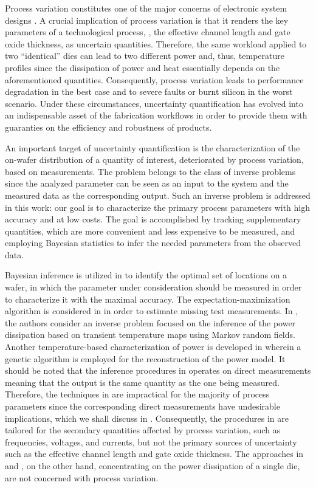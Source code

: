 Process variation constitutes one of the major concerns of electronic system designs \cite{chandrakasan2001, srivastava2010}. A crucial implication of process variation is that it renders the key parameters of a technological process, \eg, the effective channel length and gate oxide thickness, as uncertain quantities.
Therefore, the same workload applied to two ``identical'' dies can lead to two different power and, thus, temperature profiles since the dissipation of power and heat essentially depends on the aforementioned quantities.
Consequently, process variation leads to performance degradation in the best case and to severe faults or burnt silicon in the worst scenario.
Under these circumstances, uncertainty quantification has evolved into an indispensable asset of the fabrication workflows in order to provide them with guaranties on the efficiency and robustness of products.

An important target of uncertainty quantification is the characterization of the on-wafer distribution of a quantity of interest, deteriorated by process variation, based on measurements.
The problem belongs to the class of inverse problems since the analyzed parameter can be seen as an input to the system and the measured data as the corresponding output.
Such an inverse problem is addressed in this work: our goal is to characterize the primary process parameters with high accuracy and at low costs.
The goal is accomplished by tracking supplementary quantities, which are more convenient and less expensive to be measured, and employing Bayesian statistics \cite{gelman2004} to infer the needed parameters from the observed data.

Bayesian inference is utilized in \cite{zhang2010} to identify the optimal set of locations on a wafer, in which the parameter under consideration should be measured in order to characterize it with the maximal accuracy.
The expectation-maximization algorithm is considered in \cite{reda2009} in order to estimate missing test measurements.
In \cite{paek2012}, the authors consider an inverse problem focused on the inference of the power dissipation based on transient temperature maps using Markov random fields.
Another temperature-based characterization of power is developed in \cite{mesa-martinez2007} wherein a genetic algorithm is employed for the reconstruction of the power model.
It should be noted that the inference procedures in \cite{zhang2010, reda2009} operates on direct measurements meaning that the output is the same quantity as the one being measured.
Therefore, the techniques in \cite{zhang2010, reda2009} are impractical for the majority of process parameters since the corresponding direct measurements have undesirable implications, which we shall discuss in .
Consequently, the procedures in \cite{zhang2010, reda2009} are tailored for the secondary quantities affected by process variation, such as frequencies, voltages, and currents, but not the primary sources of uncertainty such as the effective channel length and gate oxide thickness.
The approaches in \cite{paek2012} and \cite{mesa-martinez2007}, on the other hand, concentrating on the power dissipation of a single die, are not concerned with process variation.

